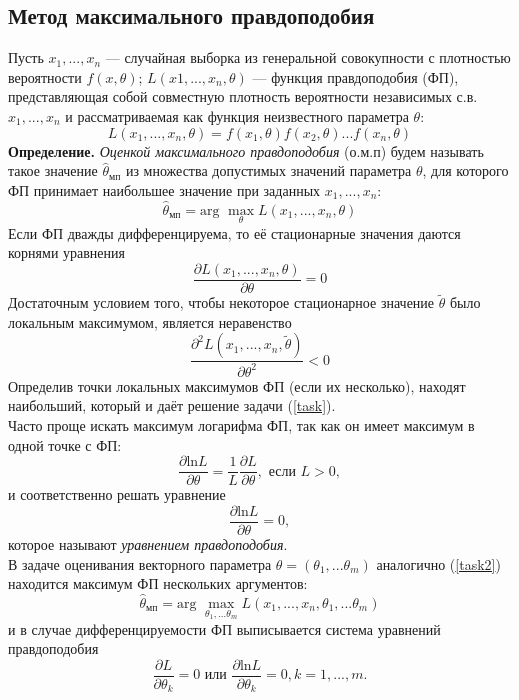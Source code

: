 \subsection{Метод максимального правдоподобия}
Пусть $x_1,...,x_n$ — случайная выборка из генеральной совокупности с плотностью вероятности $f(x,\theta)$; $L(x1,...,x_n,\theta)$ — функция правдоподобия (ФП), представляющая собой совместную плотность вероятности независимых с.в. $x_1,...,x_n$ и рассматриваемая как функция неизвестного параметра $\theta$:
\begin{equation} \label{task}
L(x_1,...,x_n,\theta)=f(x_1,\theta)f(x_2,\theta)...f(x_n,\theta)
\end{equation}
\textbf{Определение.} \emph{Оценкой максимального правдоподобия} (о.м.п) будем называть такое значение $\widehat{\theta}_{\text{мп}}$ из множества допустимых значений параметра $\theta$, для которого ФП принимает наибольшее значение при заданных $x_1,...,x_n$:
\begin{equation} \label{task2}
\widehat{\theta}_{\text{мп}}=\text{arg }\max_\theta L(x_1,...,x_n,\theta)
\end{equation}
Если ФП дважды дифференцируема, то её стационарные значения даются корнями уравнения
\begin{equation}
\frac{\partial L(x_1,...,x_n,\theta)}{\partial \theta}=0
\end{equation}
Достаточным условием того, чтобы некоторое стационарное значение $\tilde{\theta}$ было локальным максимумом, является неравенство
\begin{equation}
\frac{\partial^2 L(x_1,...,x_n,\tilde{\theta})}{\partial \theta^2}<0
\end{equation}
Определив точки локальных максимумов ФП (если их несколько), находят наибольший, который и даёт решение задачи (\ref{task}).\\
Часто проще искать максимум логарифма ФП, так как он имеет максимум в одной точке с ФП:
\begin{equation}
\frac{\partial \text{ln}L}{\partial \theta}=\frac{1}{L}\frac{\partial L}{\partial \theta}, \text{ если } L>0,
\end{equation}
и соответственно решать уравнение
\begin{equation}
\frac{\partial \text{ln}L}{\partial \theta}=0,
\end{equation}
которое называют \emph{уравнением правдоподобия}.\\
В задаче оценивания векторного параметра $\theta=(\theta_1,...\theta_m)$ аналогично (\ref{task2}) находится максимум ФП нескольких аргументов:
\begin{equation}
\widehat{\theta}_{\text{мп}}=\text{arg }\max_{\theta_1,...\theta_m} L(x_1,...,x_n,\theta_1,...\theta_m)
\end{equation}
и в случае дифференцируемости ФП выписывается система уравнений правдоподобия
\begin{equation}
\frac{\partial L}{\partial \theta_k}=0 \text{ или } \frac{\partial \text{ln}L}{\partial \theta_k}=0, k=1,...,m.
\end{equation}

